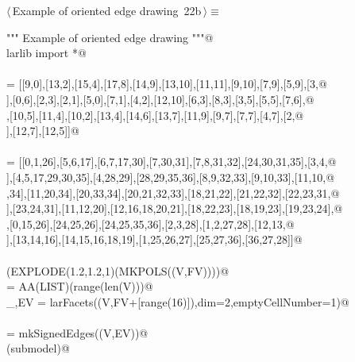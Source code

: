 \documentclass[11pt,oneside]{article}    %
\begin{document}
\begin{flushleft} \small \label{scrap36}
\protect{}$\langle\,$Example of oriented edge drawing\nobreak\ {\footnotesize 22b}$\,\rangle\equiv$
\vspace{-1ex}
\begin{list}{}{} \item
\mbox{}\verb@""" Example of oriented edge drawing """@\\
\mbox{}\verb@from larlib import *@\\
\mbox{}\verb@@\\
\mbox{}\verb@V = [[9,0],[13,2],[15,4],[17,8],[14,9],[13,10],[11,11],[9,10],[7,9],[5,9],[3,@\\
\mbox{}],[0,6],[2,3],[2,1],[5,0],[7,1],[4,2],[12,10],[6,3],[8,3],[3,5],[5,5],[7,6],@\\
\mbox{}\verb@[8,5],[10,5],[11,4],[10,2],[13,4],[14,6],[13,7],[11,9],[9,7],[7,7],[4,7],[2,@\\
\mbox{}],[12,7],[12,5]]@\\
\mbox{}\verb@@\\
\mbox{}\verb@FV = [[0,1,26],[5,6,17],[6,7,17,30],[7,30,31],[7,8,31,32],[24,30,31,35],[3,4,@\\
\mbox{}],[4,5,17,29,30,35],[4,28,29],[28,29,35,36],[8,9,32,33],[9,10,33],[11,10,@\\
\mbox{},34],[11,20,34],[20,33,34],[20,21,32,33],[18,21,22],[21,22,32],[22,23,31,@\\
\mbox{}],[23,24,31],[11,12,20],[12,16,18,20,21],[18,22,23],[18,19,23],[19,23,24],@\\
\mbox{}\verb@[15,19,24,26],[0,15,26],[24,25,26],[24,25,35,36],[2,3,28],[1,2,27,28],[12,13,@\\
\mbox{}],[13,14,16],[14,15,16,18,19],[1,25,26,27],[25,27,36],[36,27,28]]@\\
\mbox{}\verb@@\\
\mbox{}\verb@VIEW(EXPLODE(1.2,1.2,1)(MKPOLS((V,FV))))@\\
\mbox{}\verb@VV = AA(LIST)(range(len(V)))@\\
\mbox{}\verb@_,EV = larFacets((V,FV+[range(16)]),dim=2,emptyCellNumber=1)@\\
\mbox{}\verb@@\\
\mbox{}\verb@submodel = mkSignedEdges((V,EV))@\\
\mbox{}\verb@VIEW(submodel)@\\

\end{list}
\end{flushleft}
\end{document}
